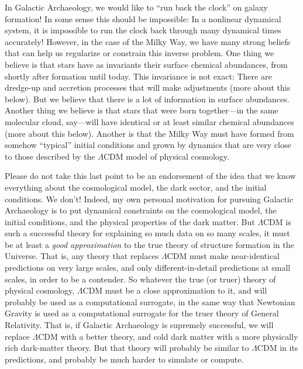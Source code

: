 \documentclass[11pt, letterpaper]{article}
\begin{document}
In Galactic Archaeology, we would like to ``run back the clock'' on
galaxy formation! In some sense this should be impossible: In a
nonlinear dynamical system, it is impossible to run the clock back
through many dynamical times accurately! However, in the case of the
Milky Way, we have many strong beliefs that can help us regularize or
constrain this inverse problem. One thing we believe is that stars
have as invariants their surface chemical abundances, from shortly
after formation until today. This invariance is not exact: There are
dredge-up and accretion processes that will make adjustments (more
about this below). But we believe that there is a lot of information
in surface abundances. Another thing we believe is that stars that
were born together---in the same molecular cloud, say---will have
identical or at least similar chemical abundances (more about this
below). Another is that the Milky Way must have formed from somehow
``typical'' initial conditions and grown by dynamics that are very
close to those described by the $\Lambda$CDM model of physical
cosmology.

Please do not take this last point to be an endorsement of the idea
that we know everything about the cosmological model, the dark sector,
and the initial conditions. We don't! Indeed, my own personal
motivation for pursuing Galactic Archaeology is to put dynamical
constraints on the cosmological model, the initial conditions, and the
physical properties of the dark matter. But $\Lambda$CDM is such a
successful theory for explaining so much data on so many scales, it
must be at least a \emph{good approximation} to the true theory of
structure formation in the Universe. That is, any theory that replaces
$\Lambda$CDM must make near-identical predictions on very large
scales, and only different-in-detail predictions at small scales, in
order to be a contender. So whatever the true (or truer) theory of
physical cosmology, $\Lambda$CDM must be a close approximation to it,
and will probably be used as a computational surrogate, in the same
way that Newtonian Gravity is used as a computational surrogate for
the truer theory of General Relativity. That is, if Galactic
Archaeology is supremely successful, we will replace $\Lambda$CDM with
a better theory, and cold dark matter with a more physically rich
dark-matter theory. But that theory will probably be similar to
$\Lambda$CDM in its predictions, and probably be much harder to
simulate or compute.
\end{document}
